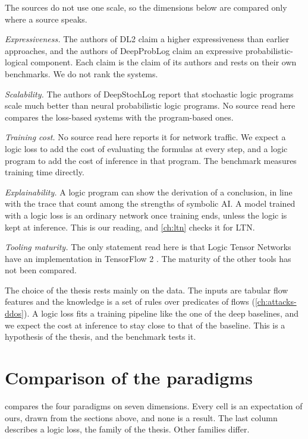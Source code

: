 The sources do not use one scale, so the dimensions below are compared
only where a source speaks.

\emph{Expressiveness.} The authors of DL2 claim a higher expressiveness than
earlier approaches, and the authors of DeepProbLog claim an expressive
probabilistic-logical component. Each claim is the claim of its authors and
rests on their own benchmarks. We do not rank the systems.

\emph{Scalability.} The authors of DeepStochLog report that stochastic logic
programs scale much better than neural probabilistic logic programs. No source
read here compares the loss-based systems with the program-based ones.

\emph{Training cost.} No source read here reports it for network traffic. We
expect a logic loss to add the cost of evaluating the formulas at every
step, and a logic program to add the cost of inference in that program. The
benchmark measures training time directly.

\emph{Explainability.} A logic program can show the derivation of a
conclusion, in line with the trace that \citet{garcez2020thirdwave} count
among the strengths of symbolic AI. A model trained with a logic loss is an
ordinary network once training ends, unless the logic is kept at inference.
This is our reading, and \cref{ch:ltn} checks it for LTN.

\emph{Tooling maturity.} The only statement read here is that Logic Tensor
Networks have an implementation in TensorFlow 2 \citep{badreddine2022ltn}.
The maturity of the other tools has not been compared.

The choice of the thesis rests mainly on the data. The inputs are tabular flow
features and the knowledge is a set of rules over predicates of flows
(\cref{ch:attacks-ddos}). A logic loss fits a training pipeline like the one
of the deep baselines, and we expect the cost at inference to stay close to
that of the baseline. This is a hypothesis of the thesis, and the benchmark
tests it.


\section{Comparison of the paradigms}
\label{sec:paradigm-comparison}

 compares the four paradigms on seven
dimensions. Every cell is an expectation of ours, drawn from
the sections above, and none is a result. The last column describes a logic
loss, the family of the thesis. Other families differ.

